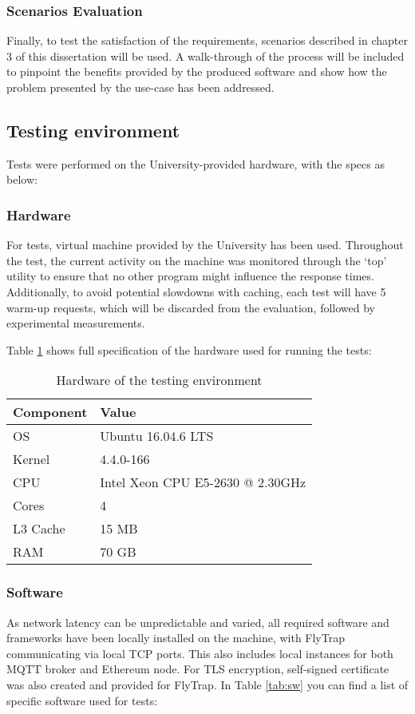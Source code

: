 \subsubsection{Scenarios Evaluation}
Finally, to test the satisfaction of the requirements, scenarios described in chapter 3 of this dissertation will be used. A walk-through of the process will be included to pinpoint the benefits provided by the produced software and show how the problem presented by the use-case has been addressed.

\subsection{Testing environment}
Tests were performed on the University-provided hardware, with the specs as below:
\subsubsection{Hardware}
For tests, virtual machine provided by the University has been used. Throughout the test, the current activity on the machine was monitored through the `top' utility to ensure that no other program might influence the response times. Additionally, to avoid potential slowdowns with caching, each test will have 5 warm-up requests, which will be discarded from the evaluation, followed by experimental measurements.

Table \ref{tab:hw} shows full specification of the hardware used for running the tests:
\begin{table}[h]
\centering
\begin{tabular}{|l|l|}
\hline
\textbf{Component} & \textbf{Value}                   \\ \hline
OS                 & Ubuntu 16.04.6 LTS               \\ \hline
Kernel             & 4.4.0-166                        \\ \hline
CPU                & Intel Xeon CPU E5-2630 @ 2.30GHz \\ \hline
Cores              & 4                                \\ \hline
L3 Cache           & 15 MB                            \\ \hline
RAM                & 70 GB                            \\ \hline
\end{tabular}
\caption{Hardware of the testing environment}
\label{tab:hw}
\end{table}
\subsubsection{Software}
As network latency can be unpredictable and varied, all required software and frameworks have been locally installed on the machine, with FlyTrap communicating via local TCP ports. This also includes local instances for both MQTT broker and Ethereum node. For TLS encryption, self-signed certificate was also created and provided for FlyTrap. In Table \ref{tab:sw} you can find a list of specific software used for tests:

